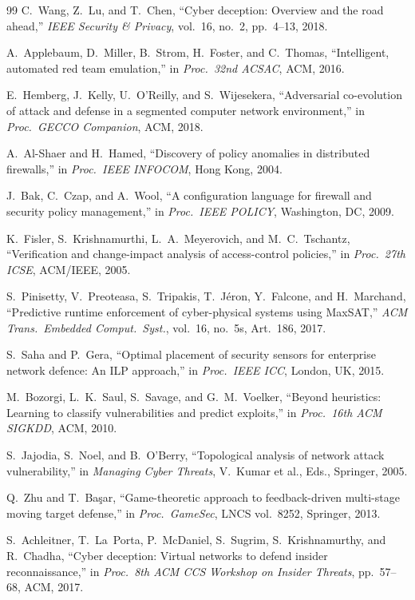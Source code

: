 \documentclass[journal]{IEEEtran}
\begin{document}
\begin{thebibliography}{99}
C.~Wang, Z.~Lu, and T.~Chen,
``Cyber deception: Overview and the road ahead,''
\emph{IEEE Security \& Privacy}, vol.~16, no.~2, pp.~4--13, 2018.

A.~Applebaum, D.~Miller, B.~Strom, H.~Foster, and C.~Thomas,
``Intelligent, automated red team emulation,''
in \emph{Proc.\ 32nd ACSAC}, ACM, 2016.

E.~Hemberg, J.~Kelly, U.~O'Reilly, and S.~Wijesekera,
``Adversarial co-evolution of attack and defense in a segmented
computer network environment,''
in \emph{Proc.\ GECCO Companion}, ACM, 2018.

A.~Al-Shaer and H.~Hamed,
``Discovery of policy anomalies in distributed firewalls,''
in \emph{Proc.\ IEEE INFOCOM}, Hong Kong, 2004.

J.~Bak, C.~Czap, and A.~Wool,
``A configuration language for firewall and security policy
management,''
in \emph{Proc.\ IEEE POLICY}, Washington, DC, 2009.

K.~Fisler, S.~Krishnamurthi, L.~A.~Meyerovich, and
M.~C.~Tschantz,
``Verification and change-impact analysis of access-control
policies,''
in \emph{Proc.\ 27th ICSE}, ACM/IEEE, 2005.

S.~Pinisetty, V.~Preoteasa, S.~Tripakis, T.~Jéron,
Y.~Falcone, and H.~Marchand,
``Predictive runtime enforcement of cyber-physical systems using
MaxSAT,''
\emph{ACM Trans.\ Embedded Comput.\ Syst.}, vol.~16, no.~5s,
Art.~186, 2017.

S.~Saha and P.~Gera,
``Optimal placement of security sensors for enterprise network
defence: An ILP approach,''
in \emph{Proc.\ IEEE ICC}, London, UK, 2015.

M.~Bozorgi, L.~K.~Saul, S.~Savage, and G.~M.~Voelker,
``Beyond heuristics: Learning to classify vulnerabilities and predict
exploits,''
in \emph{Proc.\ 16th ACM SIGKDD}, ACM, 2010.

S.~Jajodia, S.~Noel, and B.~O'Berry,
``Topological analysis of network attack vulnerability,''
in \emph{Managing Cyber Threats}, V.~Kumar et al., Eds.,
Springer, 2005.

Q.~Zhu and T.~Ba\c{s}ar,
``Game-theoretic approach to feedback-driven multi-stage moving
target defense,''
in \emph{Proc.\ GameSec}, LNCS vol.~8252, Springer, 2013.

S.~Achleitner, T.~La~Porta, P.~McDaniel, S.~Sugrim,
S.~Krishnamurthy, and R.~Chadha,
``Cyber deception: Virtual networks to defend insider
reconnaissance,''
in \emph{Proc.\ 8th ACM CCS Workshop on Insider Threats},
pp.~57--68, ACM, 2017.


\end{thebibliography}
\end{document}
